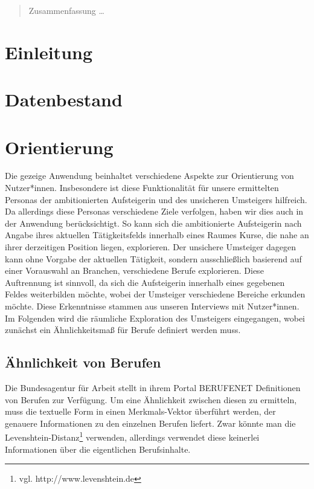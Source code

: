 \documentclass[10pt]{article}
\begin{document}
\maketitle

\begin{abstract}
Zusammenfassung \ldots
\end{abstract}

\section{Einleitung}

\section{Datenbestand}

\section{Orientierung}

Die gezeige Anwendung beinhaltet verschiedene Aspekte zur Orientierung von
Nutzer*innen. Insbesondere ist diese Funktionalität für unsere ermittelten
Personas der ambitionierten Aufsteigerin und des unsicheren Umsteigers
hilfreich. Da allerdings diese Personas verschiedene Ziele verfolgen, haben wir
dies auch in der Anwendung berücksichtigt. So kann sich die ambitionierte
Aufsteigerin nach Angabe ihres aktuellen Tätigkeitsfelds innerhalb eines Raumes
Kurse, die nahe an ihrer derzeitigen Position liegen, explorieren. Der unsichere
Umsteiger dagegen kann ohne Vorgabe der aktuellen Tätigkeit, sondern
ausschließlich basierend auf einer Vorauswahl an Branchen, verschiedene Berufe
explorieren. Diese Auftrennung ist sinnvoll, da sich die Aufsteigerin innerhalb
eines gegebenen Feldes weiterbilden möchte, wobei der Umsteiger verschiedene
Bereiche erkunden möchte. Diese Erkenntnisse stammen aus unseren Interviews mit
Nutzer*innen. Im Folgenden wird die räumliche Exploration des Umsteigers
eingegangen, wobei zunächst ein Ähnlichkeitsmaß für Berufe definiert werden
muss.

\subsection{Ähnlichkeit von Berufen}

Die Bundesagentur für Arbeit stellt in ihrem Portal BERUFENET Definitionen von
Berufen zur Verfügung. Um eine Ähnlichkeit zwischen diesen zu ermitteln, muss
die textuelle Form in einen Merkmals-Vektor überführt werden, der genauere
Informationen zu den einzelnen Berufen liefert. Zwar könnte man die
Levenshtein-Distanz\footnote{vgl. http://www.levenshtein.de} verwenden,
allerdings verwendet diese keinerlei Informationen über die eigentlichen
Berufsinhalte.\\
\end{document}
